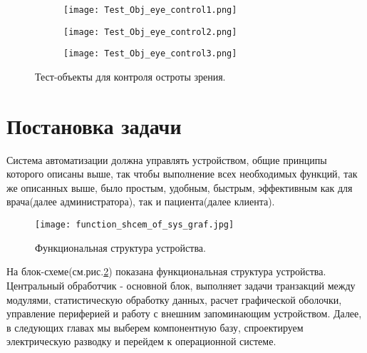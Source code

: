 \begin{figure}[ht]
    \centering
    \begin{subfigure}[b]{0.3\textwidth}
    \centering
        \texttt{[image: Test\_Obj\_eye\_control1.png]}
        \caption{}
    \end{subfigure}
    \begin{subfigure}[b]{0.3\textwidth}
    \centering
        \texttt{[image: Test\_Obj\_eye\_control2.png]}
        \caption{}
    \end{subfigure}
    \begin{subfigure}[b]{0.3\textwidth}
    \centering
        \texttt{[image: Test\_Obj\_eye\_control3.png]}
        \caption{}
    \end{subfigure}
    \caption{ Тест-объекты для контроля остроты зрения.}
    \label{fig:TestObjEC}
\end{figure}

\section{Постановка задачи}
Система автоматизации должна управлять устройством, общие принципы которого описаны выше, так чтобы выполнение всех необходимых функций, так же описанных выше, было простым, удобным, быстрым, эффективным как для врача(далее администратора), так и пациента(далее клиента).
\begin{figure}[ht]
	\centering
     \texttt{[image: function\_shcem\_of\_sys\_graf.jpg]}
	\caption{Функциональная структура устройства.}
	\label{fig:graf:FunShcSys}
\end{figure}

 На блок-схеме(см.рис.\ref{fig:graf:FunShcSys}) показана функциональная структура устройства. Центральный обработчик - основной блок, выполняет  задачи транзакций между модулями, статистическую обработку данных, расчет графической оболочки, управление периферией и работу с внешним запоминающим устройством.
Далее, в следующих главах мы выберем компонентную базу, спроектируем электрическую разводку и перейдем к операционной системе.
